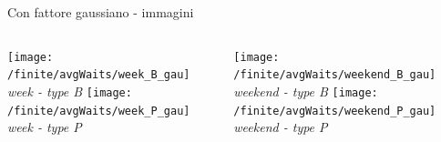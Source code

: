 \documentclass[xcolor=table]{beamer}
\begin{document}
\begin{frame}{Con fattore gaussiano - immagini}\justifying
\begin{columns}
\centering
\texttt{[image: /finite/avgWaits/week\_B\_gau]}\\
\textit{week - type B}
\texttt{[image: /finite/avgWaits/week\_P\_gau]}\\
\textit{week - type P}

\centering
\texttt{[image: /finite/avgWaits/weekend\_B\_gau]}\\
\textit{weekend - type B}
\texttt{[image: /finite/avgWaits/weekend\_P\_gau]}\\
\textit{weekend - type P}
\end{columns}
\end{frame}
\end{document}
